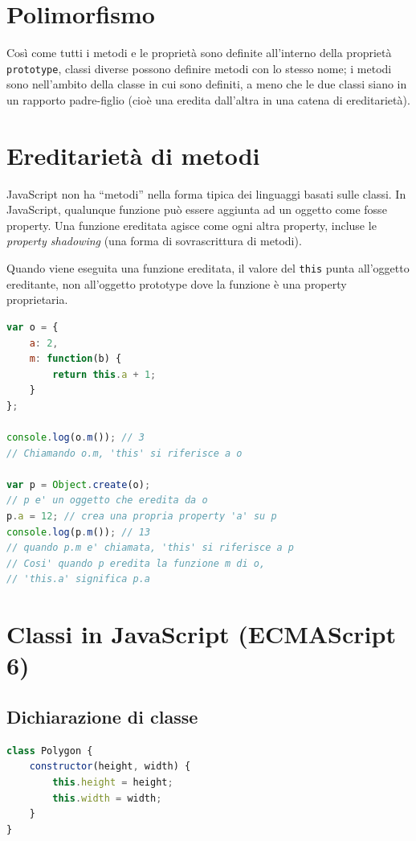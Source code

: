 \section{Polimorfismo}

Così come tutti i metodi e le proprietà sono definite all'interno della proprietà \texttt{prototype}, classi diverse possono definire metodi con lo stesso nome; i metodi sono nell'ambito della classe in cui sono definiti, a meno che le due classi siano in un rapporto padre-figlio (cioè una eredita dall'altra in una catena di ereditarietà).

\section{Ereditarietà di metodi}

JavaScript non ha ``metodi'' nella forma tipica dei linguaggi basati sulle classi. In JavaScript, qualunque funzione può essere aggiunta ad un oggetto come fosse property. Una funzione ereditata agisce come ogni altra property, incluse le \textit{property shadowing} (una forma di sovrascrittura di metodi).

Quando viene eseguita una funzione ereditata, il valore del \texttt{this} punta all'oggetto ereditante, non all'oggetto prototype dove la funzione è una property proprietaria.

\begin{lstlisting}[language=JavaScript]
var o = {
    a: 2,
    m: function(b) {
        return this.a + 1;
    }
};

console.log(o.m()); // 3
// Chiamando o.m, 'this' si riferisce a o

var p = Object.create(o);
// p e' un oggetto che eredita da o
p.a = 12; // crea una propria property 'a' su p
console.log(p.m()); // 13
// quando p.m e' chiamata, 'this' si riferisce a p
// Cosi' quando p eredita la funzione m di o,
// 'this.a' significa p.a
\end{lstlisting}

\section{Classi in JavaScript (ECMAScript 6)}

\subsection{Dichiarazione di classe}

\begin{lstlisting}[language=JavaScript]
class Polygon {
    constructor(height, width) {
        this.height = height;
        this.width = width;
    }
}
\end{lstlisting}

